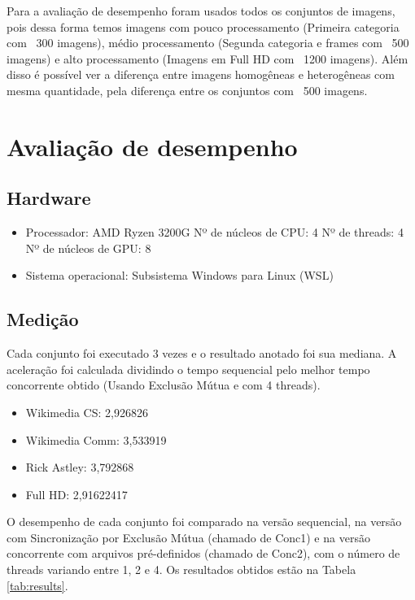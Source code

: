 \documentclass{article}
\begin{document}
Para a avaliação de desempenho foram usados todos os conjuntos de imagens, pois dessa forma temos imagens com pouco processamento (Primeira categoria com ~300 imagens), médio processamento (Segunda categoria e frames com ~500 imagens) e alto processamento (Imagens em Full HD com ~1200 imagens). Além disso é possível ver a diferença entre imagens homogêneas e heterogêneas com mesma quantidade, pela diferença entre os conjuntos com ~500 imagens. 

\section{Avaliação de desempenho}

\subsection{Hardware}
\begin{itemize}
    \item Processador: AMD Ryzen 3200G 
        \subitem Nº de núcleos de CPU: 4 
        \subitem Nº de threads: 4 
        \subitem Nº de núcleos de GPU: 8 
    \item Sistema operacional: Subsistema Windows para Linux (WSL)
\end{itemize}

\subsection{Medição}
Cada conjunto foi executado 3 vezes e o resultado anotado foi sua mediana. A aceleração foi calculada dividindo o tempo sequencial pelo melhor tempo concorrente obtido (Usando Exclusão Mútua e com 4 threads).
\begin{itemize}
    \item Wikimedia CS: 2,926826
    \item Wikimedia Comm: 3,533919
    \item Rick Astley: 3,792868
    \item Full HD: 2,91622417
\end{itemize}

O desempenho de cada conjunto foi comparado na versão sequencial, na versão com Sincronização por Exclusão Mútua (chamado de Conc1) e na versão concorrente com arquivos pré-definidos (chamado de Conc2), com o número de threads variando entre 1, 2 e 4. Os resultados obtidos estão na Tabela \ref{tab:results}.
\end{document}
